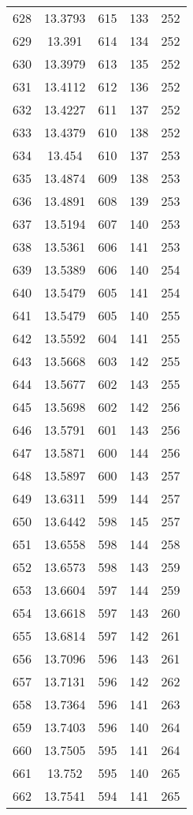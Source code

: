 \documentclass[12pt,a4paper]{article}
\begin{document}
\begin{tabular}{r|cccc}
	628 & 13.3793 & 615 & 133 & 252 \\
	629 & 13.391 & 614 & 134 & 252 \\
	630 & 13.3979 & 613 & 135 & 252 \\
	631 & 13.4112 & 612 & 136 & 252 \\
	632 & 13.4227 & 611 & 137 & 252 \\
	633 & 13.4379 & 610 & 138 & 252 \\
	634 & 13.454 & 610 & 137 & 253 \\
	635 & 13.4874 & 609 & 138 & 253 \\
	636 & 13.4891 & 608 & 139 & 253 \\
	637 & 13.5194 & 607 & 140 & 253 \\
	638 & 13.5361 & 606 & 141 & 253 \\
	639 & 13.5389 & 606 & 140 & 254 \\
	640 & 13.5479 & 605 & 141 & 254 \\
	641 & 13.5479 & 605 & 140 & 255 \\
	642 & 13.5592 & 604 & 141 & 255 \\
	643 & 13.5668 & 603 & 142 & 255 \\
	644 & 13.5677 & 602 & 143 & 255 \\
	645 & 13.5698 & 602 & 142 & 256 \\
	646 & 13.5791 & 601 & 143 & 256 \\
	647 & 13.5871 & 600 & 144 & 256 \\
	648 & 13.5897 & 600 & 143 & 257 \\
	649 & 13.6311 & 599 & 144 & 257 \\
	650 & 13.6442 & 598 & 145 & 257 \\
	651 & 13.6558 & 598 & 144 & 258 \\
	652 & 13.6573 & 598 & 143 & 259 \\
	653 & 13.6604 & 597 & 144 & 259 \\
	654 & 13.6618 & 597 & 143 & 260 \\
	655 & 13.6814 & 597 & 142 & 261 \\
	656 & 13.7096 & 596 & 143 & 261 \\
	657 & 13.7131 & 596 & 142 & 262 \\
	658 & 13.7364 & 596 & 141 & 263 \\
	659 & 13.7403 & 596 & 140 & 264 \\
	660 & 13.7505 & 595 & 141 & 264 \\
	661 & 13.752 & 595 & 140 & 265 \\
	662 & 13.7541 & 594 & 141 & 265 \\

\end{tabular}
\end{document}
